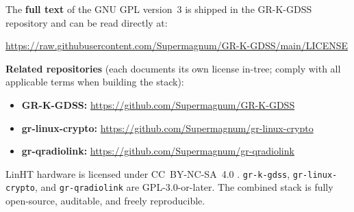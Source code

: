 \documentclass[10pt,a4paper,twocolumn]{article}
\begin{document}
The \textbf{full text} of the GNU GPL version~3 is shipped in the GR-K-GDSS repository and can be read directly at:

\noindent\url{https://raw.githubusercontent.com/Supermagnum/GR-K-GDSS/main/LICENSE}

\noindent\textbf{Related repositories} (each documents its own license in-tree; comply with all applicable terms when building the stack):

\begin{itemize}\setlength{\itemsep}{2pt}
  \item \textbf{GR-K-GDSS:} \url{https://github.com/Supermagnum/GR-K-GDSS}
  \item \textbf{gr-linux-crypto:} \url{https://github.com/Supermagnum/gr-linux-crypto}
  \item \textbf{gr-qradiolink:} \url{https://github.com/Supermagnum/gr-qradiolink}
\end{itemize}

LinHT hardware is licensed under CC~BY-NC-SA~4.0 \cite{cc_by_nc_sa_40}. \texttt{gr-k-gdss}, \texttt{gr-linux-crypto}, and \texttt{gr-qradiolink} are GPL-3.0-or-later. The combined stack is fully open-source, auditable, and freely reproducible.
\end{document}
